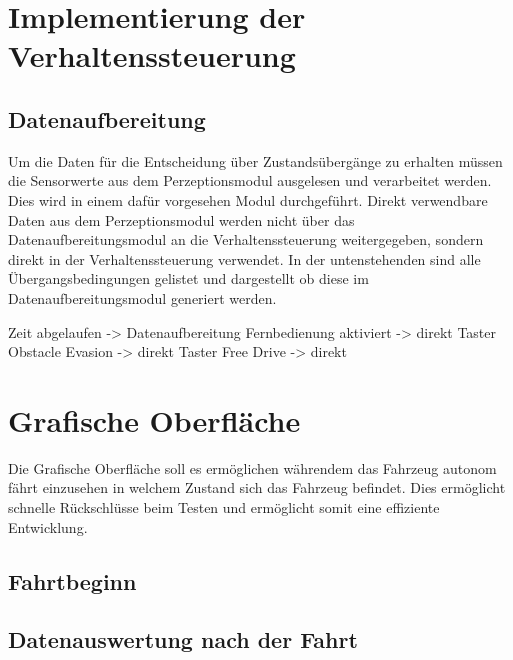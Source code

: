 \section{Implementierung der Verhaltenssteuerung}




\subsection{Datenaufbereitung}
Um die Daten für die Entscheidung über Zustandsübergänge zu erhalten müssen die Sensorwerte aus dem Perzeptionsmodul ausgelesen und verarbeitet werden. Dies wird in einem dafür vorgesehen Modul durchgeführt. Direkt verwendbare Daten aus dem Perzeptionsmodul werden nicht über das Datenaufbereitungsmodul an die Verhaltenssteuerung weitergegeben, sondern direkt in der Verhaltenssteuerung verwendet. In der untenstehenden sind alle Übergangsbedingungen gelistet und dargestellt ob diese im Datenaufbereitungsmodul generiert werden. 

Zeit abgelaufen         -> Datenaufbereitung
Fernbedienung aktiviert -> direkt
Taster Obstacle Evasion -> direkt
Taster Free Drive       -> direkt


\section{Grafische Oberfläche}
Die Grafische Oberfläche soll es ermöglichen währendem das Fahrzeug autonom fährt einzusehen in welchem Zustand sich das Fahrzeug befindet. Dies ermöglicht schnelle Rückschlüsse beim Testen und ermöglicht somit eine effiziente Entwicklung.
\subsection{Fahrtbeginn}
\subsection{Datenauswertung nach der Fahrt}






